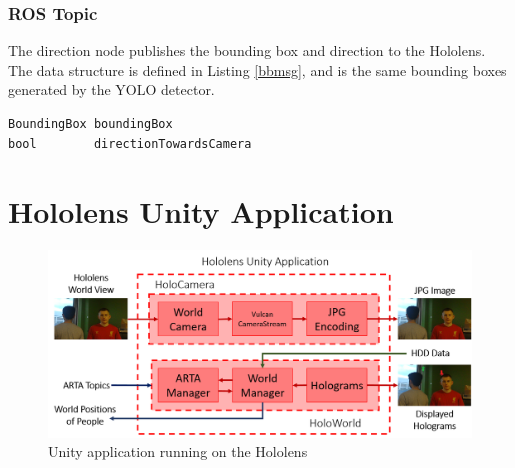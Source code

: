 \vspace{-1\baselineskip}

\subsubsection{ROS Topic}
The direction node publishes the bounding box and direction to the Hololens. The  data structure is defined in Listing \ref{bbmsg}, and is the same bounding boxes generated by the YOLO detector. \\

\begin{lstlisting}[language=Mymatlab,caption={BoundingBoxDirection.msg}]
BoundingBox boundingBox
bool        directionTowardsCamera
\end{lstlisting}

\newpage
\section{Hololens Unity Application}

\begin{figure}[ht]
	\centering
	\includegraphics[width=1.0\linewidth]{img/chapter5_implementation/hololensSystemDiagram.png}
	\caption{Unity application running on the Hololens}
	\label{fig:detailedHololens}
\end{figure}

